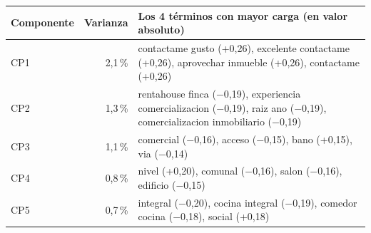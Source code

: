 \begin{tabular}{l r >{\raggedright\arraybackslash}p{}}
\toprule
Componente & Varianza & Los 4 términos con mayor carga (en valor absoluto) \\
\midrule
CP1 & 2,1\,\% & contactame gusto (+0,26), excelente contactame (+0,26), aprovechar inmueble (+0,26), contactame (+0,26) \\
CP2 & 1,3\,\% & rentahouse finca ($-$0,19), experiencia comercializacion ($-$0,19), raiz ano ($-$0,19), comercializacion inmobiliario ($-$0,19) \\
CP3 & 1,1\,\% & comercial ($-$0,16), acceso ($-$0,15), bano (+0,15), via ($-$0,14) \\
CP4 & 0,8\,\% & nivel (+0,20), comunal ($-$0,16), salon ($-$0,16), edificio ($-$0,15) \\
CP5 & 0,7\,\% & integral ($-$0,20), cocina integral ($-$0,19), comedor cocina ($-$0,18), social (+0,18) \\
\bottomrule
\end{tabular}
